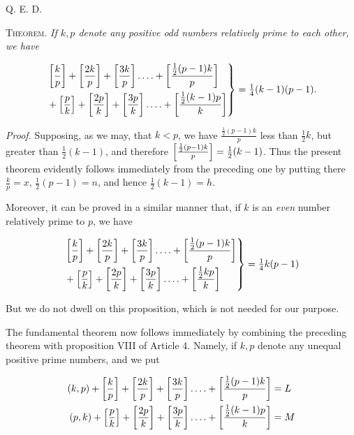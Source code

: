 Q. E. D.


\textsc{Theorem.} \emph{If $k,p$ denote any positive odd numbers relatively prime to each other, we have}

\[
\begin{aligned}
\left.\begin{aligned}
&\left[\frac kp\right]+\left[\frac{2k}{p}\right]+\left[\frac{3k}{p}\right]\mathinner{.\,.\,.\,.}+\left[\frac{\frac12(p-1)k}{p}\right]\\
&+\left[\frac pk\right]+\left[\frac{2p}{k}\right]+\left[\frac{3p}{k}\right]\mathinner{.\,.\,.\,.}+\left[\frac{\frac12(k-1)p}{k}\right]
\end{aligned}\right\}=\tfrac14(k-1)(p-1).
\end{aligned}
\]

\emph{Proof.} Supposing, as we may, that $k<p$, we have $\frac{\frac12(p-1)k}{p}$ less than $\frac12 k$, but greater than $\frac12(k-1)$, and therefore $\left[\frac{\frac12(p-1)k}{p}\right]=\frac12(k-1)$. Thus the present theorem evidently follows immediately from the preceding one by putting there $\frac kp=x$, $\frac12(p-1)=n$, and hence $\frac12(k-1)=h$.

Moreover, it can be proved in a similar manner that, if $k$ is an \emph{even} number relatively prime to $p$, we have

\[
\begin{aligned}
\left.\begin{aligned}
&\left[\frac kp\right]+\left[\frac{2k}{p}\right]+\left[\frac{3k}{p}\right]\mathinner{.\,.\,.\,.}+\left[\frac{\frac12(p-1)k}{p}\right]\\
&+\left[\frac pk\right]+\left[\frac{2p}{k}\right]+\left[\frac{3p}{k}\right]\mathinner{.\,.\,.\,.}+\left[\frac{\frac12 kp}{k}\right]
\end{aligned}\right\}=\tfrac14 k(p-1)
\end{aligned}
\]

But we do not dwell on this proposition, which is not needed for our purpose.

\clearpage{}

The fundamental theorem now follows immediately by combining the preceding theorem with proposition VIII of Article 4. Namely, if $k,p$ denote any unequal positive prime numbers, and we put

\[
\begin{aligned}
(k,p)+\left[\frac kp\right]+\left[\frac{2k}{p}\right]+\left[\frac{3k}{p}\right]\mathinner{.\,.\,.\,.}+\left[\frac{\frac12(p-1)k}{p}\right]&=L\\
(p,k)+\left[\frac pk\right]+\left[\frac{2p}{k}\right]+\left[\frac{3p}{k}\right]\mathinner{.\,.\,.\,.}+\left[\frac{\frac12(k-1)p}{k}\right]&=M
\end{aligned}
\]

